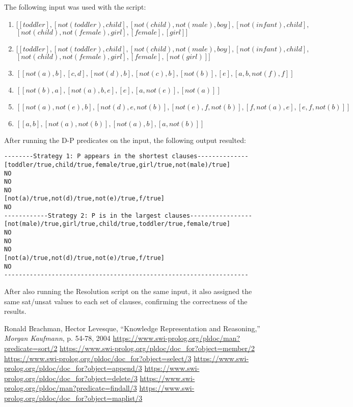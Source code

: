 \documentclass{article}
\begin{document}
The following input was used with the script:
\begin{enumerate}
	\item $[[toddler],[not(toddler),child],[not(child),not(male),boy],[not(infant),child],$ \hfill \\ $[not(child),not(female),girl], [female], [girl]]$
	\item $[[toddler],[not(toddler),child],[not(child),not(male),boy],[not(infant),child],$ \hfill \\$ [not(child),not(female),girl], [female], [not(girl)]]$
	\item $[[not(a),b],[c,d],[not(d),b],[not(c),b],[not(b)],[e],[a,b,not(f),f]]$
	\item $[[not(b),a],[not(a),b,e],[e],[a, not(e)],[not(a)]]$
	\item $[[not(a),not(e),b],[not(d),e,not(b)],[not(e),f,not(b)],[f,not(a),e],[e,f,not(b)]]$
	\item $[[a,b],[not(a),not(b)] ,[not(a),b] ,[a,not(b)]]$
\end{enumerate}

After running the D-P predicates on the input, the following output resulted:

\begin{verbatim}
--------Strategy 1: P appears in the shortest clauses--------------
[toddler/true,child/true,female/true,girl/true,not(male)/true]
NO
NO
NO
[not(a)/true,not(d)/true,not(e)/true,f/true]
NO
------------Strategy 2: P is in the largest clauses-----------------
[not(male)/true,girl/true,child/true,toddler/true,female/true]
NO
NO
NO
[not(a)/true,not(d)/true,not(e)/true,f/true]
NO
-------------------------------------------------------------------
\end{verbatim}

After also running the Resolution script on the same input, it also assigned the same sat/unsat values to each set of clauses, confirming the correctness of the results.

\newpage

\begin{thebibliography}{1.7} 
	 \color{cyan}Ronald Brachman, Hector Levesque, “Knowledge Representation and Reasoning,” \textit{Morgan Kaufmann}, p. 54-78, 2004
	 \url{https://www.swi-prolog.org/pldoc/man?predicate=sort/2}
	 \url{https://www.swi-prolog.org/pldoc/doc_for?object=member/2}
	 \url{https://www.swi-prolog.org/pldoc/doc_for?object=select/3}
	 \url{https://www.swi-prolog.org/pldoc/doc_for?object=append/3}
	 \url{https://www.swi-prolog.org/pldoc/doc_for?object=delete/3}
	 \url{https://www.swi-prolog.org/pldoc/man?predicate=findall/3}
	 \url{https://www.swi-prolog.org/pldoc/doc_for?object=maplist/3}
\end{thebibliography}
\end{document}
